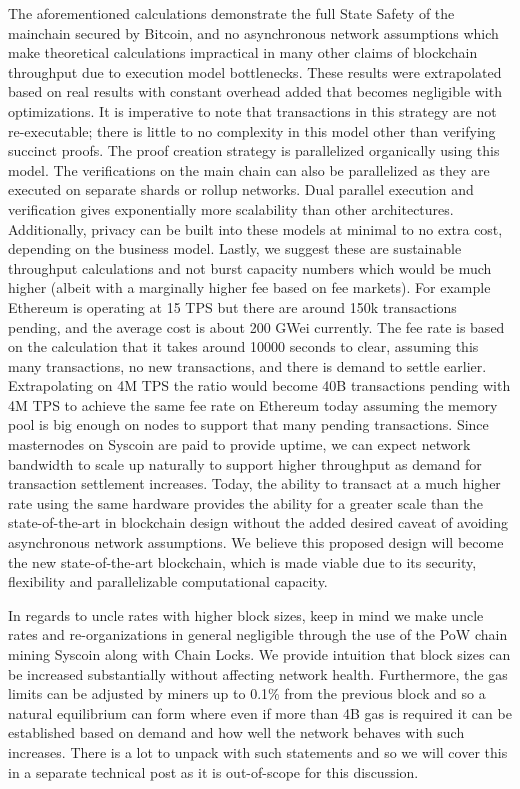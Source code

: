 \documentclass[peerreview]{ieeesyscoin}
\begin{document}
The aforementioned calculations demonstrate the full State Safety of the mainchain secured by Bitcoin, and no asynchronous network assumptions which make theoretical calculations impractical in many other claims of blockchain throughput due to execution model bottlenecks. These results were extrapolated based on real results with constant overhead added that becomes negligible with optimizations. It is imperative to  note that transactions in this strategy are not re-executable; there is little to no complexity in this model other than verifying succinct proofs. The proof creation strategy is parallelized organically using this model. The verifications on the main chain can also be parallelized as they are executed on separate shards or rollup networks. Dual parallel execution and verification gives exponentially more scalability than other architectures. Additionally, privacy can be built into these models at minimal to no extra cost, depending on the business model. Lastly, we suggest  these are sustainable throughput calculations and not burst capacity numbers which would be much higher (albeit with a marginally higher fee based on fee markets). For example Ethereum is operating at 15 TPS but there are around 150k transactions pending, and the average cost is about 200 GWei currently. The fee rate is based on the calculation that it  takes around 10000 seconds to clear, assuming this many transactions, no new transactions, and there is demand to settle earlier. Extrapolating on 4M TPS the ratio would become 40B transactions pending with 4M TPS to achieve the same fee rate on Ethereum today assuming the memory pool is big enough on nodes to support that many pending transactions. Since masternodes on Syscoin are paid to provide uptime, we can expect network bandwidth to scale up naturally to support higher throughput as demand for transaction settlement increases. Today, the ability to transact at a much higher rate using the same hardware provides the ability for a greater scale than the state-of-the-art in blockchain design without the added desired caveat of avoiding asynchronous network assumptions. We believe this proposed design will become the new state-of-the-art blockchain, which is made viable due to its security, flexibility and parallelizable computational capacity.

In regards to uncle rates with higher block sizes, keep in mind we make uncle rates and re-organizations in general negligible through the use of the PoW chain mining Syscoin along with Chain Locks. We provide intuition that block sizes can be increased substantially without affecting network health. Furthermore, the gas limits can be adjusted by miners up to 0.1\% from the previous block and so a natural equilibrium can form where even if more than 4B gas is required it can be established based on demand and how well the network behaves with such increases. There is a lot to unpack with such statements and so we will cover this in a separate technical post as it is out-of-scope for this discussion. 
\end{document}
